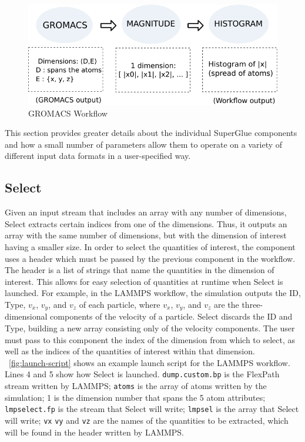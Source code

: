\begin{figure}
  \center
  \includegraphics[width=\columnwidth]{fig/wflow_gromacs}
  \vspace{-0.25in}
  \caption{GROMACS Workflow}
  \label{fig:gromacs-workflow}
  \vspace{-0.15in}
\end{figure}



This section provides greater details about the individual SuperGlue components
and how a small number of
parameters allow them to operate on a variety
of different input data formats in
a user-specified way.

\subsection{Select}

Given an input stream that includes an array with
any number of dimensions,
Select extracts certain indices from one of
the dimensions. Thus, it outputs an array
with the same number of dimensions,
but with the dimension of interest having a
smaller size. In order to select the quantities of
interest, the component uses a header which
must be passed by the previous component in the
workflow. The header is a list of strings that
name the quantities in the
dimension of interest. This allows for easy
selection of quantities at runtime when
Select is launched. For example, in the LAMMPS workflow,
the simulation outputs the ID, Type, $v_{x}$, $v_y$, and $v_z$
of each particle, where $v_{x}$, $v_y$, and $v_z$ are the
three-dimensional components of the velocity of a particle.
Select discards the ID and Type, building a new
array consisting only of the velocity components.
The user must pass to
this component the index of the dimension
from which to select, as well as the
indices of the quantities of interest within that dimension.
~\autoref{fig:launch-script} shows an example launch
script for the LAMMPS workflow. Lines 4 and 5
show how Select is launched. \verb|dump.custom.bp|
is the FlexPath stream written by LAMMPS; \verb|atoms|
is the array of atoms written by the simulation; 
1 is the dimension number that spans the 5 atom attributes;
\verb|lmpselect.fp| is the stream that Select will write;
\verb|lmpsel| is the array that Select will write;
\verb|vx| \verb|vy| and \verb|vz| are the
names of the quantities
to be extracted, which will be found in the
header written by LAMMPS.


